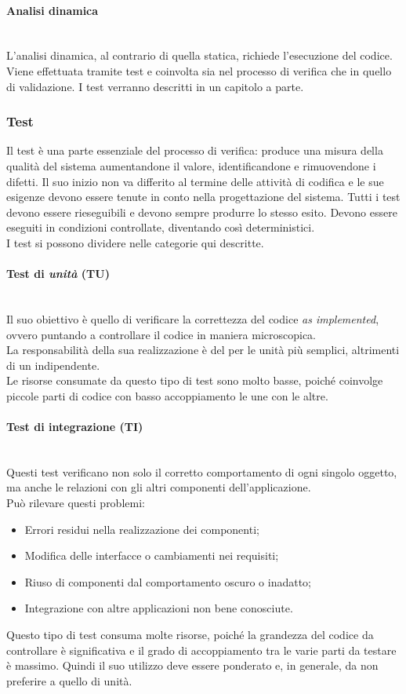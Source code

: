 	\paragraph{Analisi dinamica}
	~\\L'analisi dinamica, al contrario di quella statica, richiede l'esecuzione del codice.
	Viene effettuata tramite test e coinvolta sia nel processo di verifica che in quello di validazione.
	I test verranno descritti in un capitolo a parte.
	\subsubsection{Test}
	Il test è una parte essenziale del processo di verifica: produce una misura della qualità del sistema
	aumentandone il valore, identificandone e rimuovendone i difetti. Il suo inizio non va differito
	al termine delle attività di codifica e le sue esigenze devono essere tenute in conto nella progettazione del sistema. Tutti i test devono essere rieseguibili e devono sempre produrre lo stesso esito. Devono essere eseguiti in condizioni controllate, diventando così deterministici.
	~\\I test si possono dividere nelle categorie qui descritte.
		\paragraph{Test di \emph{unità} (TU)}
		~\\Il suo obiettivo è quello di verificare la correttezza del codice \emph{as implemented}, ovvero
		puntando a controllare il codice in maniera microscopica.
		\\La responsabilità della sua realizzazione è del \progr{} per le unità più semplici, altrimenti
		di un \ver{} indipendente.
		\\Le risorse consumate da questo tipo di test sono molto basse, poiché coinvolge piccole parti di codice con basso accoppiamento le une con le altre. 
		\paragraph{Test di integrazione (TI)}
		~\\Questi test verificano non solo il corretto comportamento di ogni singolo oggetto, 
		ma anche le relazioni con gli altri componenti dell'applicazione.
		~\\Può rilevare questi problemi:
		\begin{itemize}
			\item Errori residui nella realizzazione dei componenti;
			\item Modifica delle interfacce o cambiamenti nei requisiti;
			\item Riuso di componenti dal comportamento oscuro o inadatto;
			\item Integrazione con altre applicazioni non bene conosciute.
		\end{itemize}
		Questo tipo di test consuma molte risorse, poiché la grandezza del codice da controllare è 
		significativa e	il grado di accoppiamento tra le varie parti da testare è massimo. 
		Quindi il suo utilizzo deve essere ponderato e, in generale, da non preferire a quello di unità.
